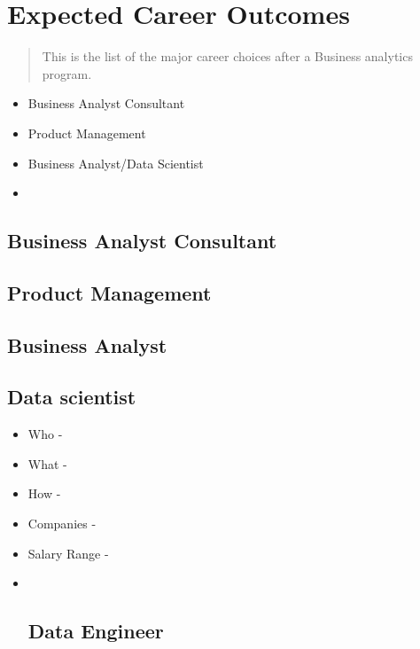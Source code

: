 \documentclass[
]{book}
\providecommand{\tightlist}{%
  \setlength{\itemsep}{0pt}\setlength{\parskip}{0pt}}
\begin{document}
\hypertarget{expected-career-outcomes}{%
\section{Expected Career Outcomes}\label{expected-career-outcomes}}

\begin{quote}
This is the list of the major career choices after a Business analytics program.
\end{quote}

\begin{itemize}
\tightlist
\item
  Business Analyst Consultant
\item
  Product Management
\item
  Business Analyst/Data Scientist
\item
\end{itemize}

\hypertarget{business-analyst-consultant}{%
\subsection{Business Analyst Consultant}\label{business-analyst-consultant}}

\hypertarget{product-management}{%
\subsection{Product Management}\label{product-management}}

\hypertarget{business-analyst}{%
\subsection{Business Analyst}\label{business-analyst}}

\hypertarget{data-scientist}{%
\subsection{Data scientist}\label{data-scientist}}

\begin{itemize}
\item
  Who -
\item
  What -
\item
  How -
\item
  Companies -
\item
  Salary Range -
\item ~
  \hypertarget{data-engineer}{%
  \subsection{Data Engineer}\label{data-engineer}}
\end{itemize}
\end{document}
